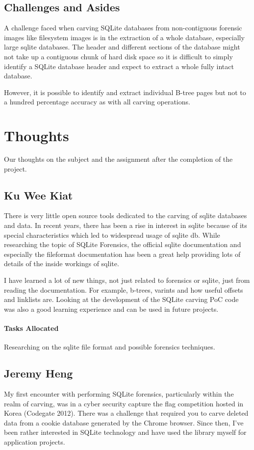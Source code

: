 \documentclass{article}
\begin{document}
\subsection{Challenges and Asides}
A challenge faced when carving SQLite databases from non-contiguous forensic images like filesystem images is in the extraction of a whole database, especially large sqlite databases. The header and different sections of the database might not take up a contiguous  chunk of hard disk space so it is difficult to simply identify a SQLite database header and expect to extract a whole fully intact database. 

However, it is possible to identify and extract individual B-tree pages but not to a hundred percentage accuracy as with all carving operations.

\section{Thoughts}

Our thoughts on the subject and the assignment after the completion of the project.

\subsection{Ku Wee Kiat}
There is very little open source tools dedicated to the carving of sqlite databases and data. In recent years, there has been a rise in interest in sqlite because of its special characteristics which led to widespread usage of sqlite db. While researching the topic of SQLite Forensics, the official sqlite documentation and especially the fileformat documentation has been a great help providing lots of details of the inside workings of sqlite. 

I have learned a lot of new things, not just related to forensics or sqlite, just from reading the documentation. For example, b-trees, varints and how useful offsets and linklists are. Looking at the development of the SQLite carving PoC code was also a good learning experience and can be used in future projects.

\paragraph{Tasks Allocated} Researching on the sqlite file format and possible forensics techniques.

\subsection{Jeremy Heng}
My first encounter with performing SQLite forensics, particularly within the realm of carving, was in a cyber security capture the flag competition hosted in Korea (Codegate 2012). There was a challenge that required you to carve deleted data from a cookie database generated by the Chrome browser. Since then, I've been rather interested in SQLite technology and have used the library myself for application projects.
\end{document}
